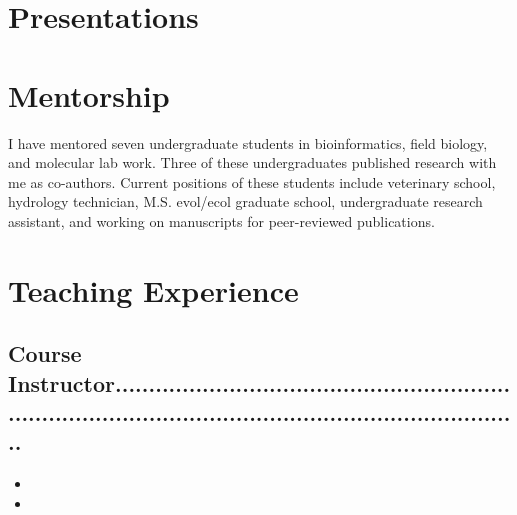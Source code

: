 \documentclass[11pt,a4paper,sans]{moderncv}        %
\begin{document}
\section{Presentations}
\begin{refsection}
\nocite{*}
\printbibliography[heading=none]
\end{refsection}

\section{Mentorship}
I have mentored seven undergraduate students in bioinformatics, field biology, and molecular lab work. Three of these undergraduates published research with me as co-authors. Current positions of these students include veterinary school, hydrology technician, M.S. evol/ecol graduate school, undergraduate research assistant, and working on manuscripts for peer-reviewed publications.

\section{Teaching Experience}
\subsection{{Course Instructor}\footnotesize{........................................................................................................................................}}
\begin{itemize}
    \item{}
    \item{}
\end{itemize}
\end{document}
